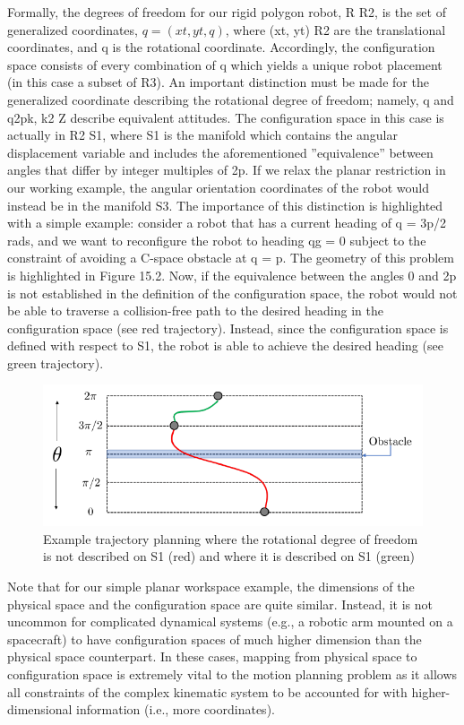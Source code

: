 \documentclass[twoside]{article}
\begin{document}
Formally, the degrees of freedom for our rigid polygon robot, R R2, is the set of generalized coordinates, $q = (xt, yt, q)$, where (xt, yt) R2 are the translational coordinates, and q is the rotational coordinate. Accordingly, the configuration space consists of every combination of q which yields a unique robot placement (in this case a subset of R3). An important distinction must be made for the generalized coordinate describing the rotational degree of freedom; namely, q and q2pk, k2 Z describe equivalent attitudes. The configuration space in this case is actually in R2 S1, where S1 is the manifold which contains the angular displacement variable and includes the aforementioned ”equivalence” between angles that differ by integer multiples of 2p. If we relax the planar restriction in our working example, the angular orientation coordinates of the robot would instead be in the manifold S3. The importance of this distinction is highlighted with a simple example: consider a robot that has a current heading of q = 3p/2 rads, and we want to reconfigure the robot to heading qg = 0 subject to the constraint of avoiding a C-space obstacle at q = p. The geometry of this problem is highlighted in Figure 15.2. Now, if the equivalence between the angles 0 and 2p is not established in the definition of the configuration space, the robot would not be able to traverse a collision-free path to the desired heading in the configuration space (see red trajectory). Instead, since the configuration space is defined with respect to S1, the robot is able to achieve the desired heading (see green trajectory).

\begin{figure}[h]
\begin{center}
\includegraphics{fig15_2.PNG}
\caption{Example trajectory planning where the rotational degree of freedom is not described on S1 (red) and where it is described on S1 (green)}
\end{center}
\end{figure}

Note that for our simple planar workspace example, the dimensions of the physical space and the configuration space are quite similar. Instead, it is not uncommon for complicated dynamical systems (e.g., a robotic arm mounted on a spacecraft) to have configuration spaces of much higher dimension than the physical space counterpart. In these cases, mapping from physical space to configuration space is extremely
vital to the motion planning problem as it allows all constraints of the complex kinematic system to be accounted for with higher-dimensional information (i.e., more coordinates).
\end{document}
